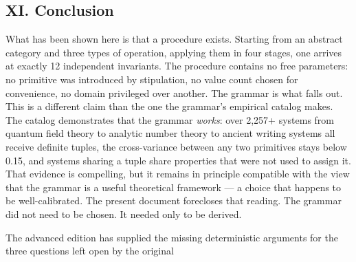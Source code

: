 \documentclass[12pt,a4paper]{article}
\begin{document}
\subsection{XI. Conclusion}
What has been shown here is that a procedure exists. Starting from an abstract category and three types of operation,
applying them in four stages, one arrives at exactly 12 independent invariants. The procedure contains no free
parameters: no primitive was introduced by stipulation, no value count chosen for convenience, no domain privileged
over another. The grammar is what falls out.
This is a different claim than the one the grammar's empirical catalog makes. The catalog demonstrates that the grammar
\emph{works}: over 2,257+ systems from quantum field theory to analytic number theory to ancient writing systems all
receive definite tuples, the cross-variance between any two primitives stays below 0.15, and systems sharing a tuple
share properties that were not used to assign it. That evidence is compelling, but it remains in principle
compatible with the view that the grammar is a useful theoretical framework --- a choice that happens to be
well-calibrated. The present document forecloses that reading. The grammar did not need to be chosen. It needed only to be derived.

The advanced edition has supplied the missing deterministic arguments for the three questions left open by the original
\end{document}
